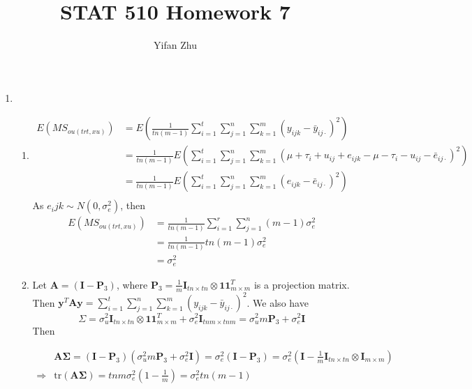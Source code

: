 \documentclass{article}
\begin{document}
\setcounter{MaxMatrixCols}{20}



\title{STAT 510 Homework 7}
\author{Yifan Zhu}
\maketitle

\begin{enumerate}[leftmargin = 0 em, label = \arabic*., font = \bfseries]
	\item
	      \begin{enumerate}
	      	\item 
	      	\begin{align*}
	      	 E(MS_{ou(trt,xu)}) & = E \left(\frac{1}{tn(m-1)} \sum_{i=1}^t \sum_{j=1}^n \sum_{k = 1}^m (y_{ijk} - \bar{y}_{ij \cdot })^2 \right)\\
	      	 & = \frac{1}{tn(m-1)} E \left( \sum_{i=1}^t \sum_{j=1}^n \sum_{k=1}^m (\mu + \tau_i + u_{ij} + e_{ijk} - \mu - \tau_i - u_{ij} - \bar{e}_{ij \cdot})^2 \right) \\
	      	 & = \frac{1}{tn(m-1)} E \left( \sum_{i = 1}^t \sum_{j = 1}^n \sum_{k = 1}^m (e_{ijk} - \bar{e}_{ij \cdot} )^2 \right) \\
	      	 \end{align*}
	      	 As $e_ijk \sim N(0, \sigma_e^2)$, then
	      	 \begin{align*}
	      	 E \left( MS_{ou(trt, xu)} \right) & = \frac{1}{tn(m-1)} \sum_{i = 1}^r \sum_{j = 1}^n (m-1) \sigma_{e}^2\\
	      	 & = \frac{1}{tn (m-1)} tn (m-1) \sigma_e^2 \\
	      	 & = \sigma_e^2
	      	 \end{align*}
	      	 
	      	 \item 
	      	 Let $\bm A = (\bm I - \bm P_{3})$, where $\bm P_3 = \frac{1}{m} \bm I_{tn \times tn} \otimes \bm 1 \bm 1^T _{m \times m}$ is a projection matrix. Then $\bm y^T \bm A \bm y = \sum_{i=1}^t \sum_{j = 1}^n \sum_{k = 1}^m (y_{ijk} - \bar{y}_{ij \cdot})^2$. We also have 
	      	 \[ \Sigma = \sigma_u^2 \bm I_{tn \times tn} \otimes \bm 1 \bm 1^T_{m \times m} + \sigma_e^2 \bm I_{tnm \times tnm} = \sigma_{u}^2 m \bm P_{3} + \sigma_e^2 \bm I\]
	      	 Then

	      	 \begin{align*}
	      	 &\bm A \bm \Sigma = (\bm I - \bm P_3) (\sigma_u^2 m \bm P_3 + \sigma_e^2 \bm I) = \sigma_e^2 (\bm I - \bm P_3) = \sigma_e^2 (\bm I - \frac{1}{m} \bm I_{tn \times tn} \otimes \bm I_{m\times m})\\
	      	  \Rightarrow & \mathrm{tr}(\bm A \bm \Sigma) = tnm \sigma_e^2 (1 - \frac{1}{m}) = \sigma_e^2 tn (m-1)
	      	 \end{align*}


\end{enumerate}
\end{enumerate}
\end{document}
